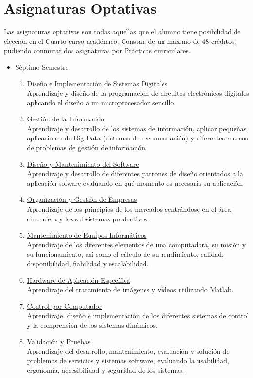 \section{Asignaturas Optativas}
Las asignaturas optativas son todas aquellas que el alumno tiene posibilidad de elección en el Cuarto curso académico. Constan de un máximo de 48 créditos, pudiendo   conmutar dos asignaturas por Prácticas curriculares. 
\begin{itemize}
\item Séptimo Semestre
\begin{enumerate}
\item \underline{Diseño e Implementación de Sistemas Digitales}\\Aprendizaje y diseño de la programación de circuitos electrónicos digitales aplicando el diseño a un microprocesador sencillo. 
\item \underline{Gestión de la Información}\\Aprendizaje y desarrollo de los sistemas de información, aplicar pequeñas aplicaciones de Big Data (sistemas de recomendación) y diferentes marcos de problemas de gestión de información. 
\item \underline{Diseño y Mantenimiento del Software}\\Aprendizaje y desarrollo de diferentes patrones de diseño orientados a la aplicación sofware evaluando en qué momento es necesaria su aplicación. 
\item \underline{Organización y Gestión de Empresas}\\Aprendizaje de los principios de los mercados centrándose en el área cinanciera y  los subsistemas productivos. 
\item \underline{Mantenimiento de Equipos Informáticos}\\Aprendizaje de los diferentes elementos de una computadora, su misión y su funcionamiento,  así como el cálculo de su rendimiento, calidad, disponibilidad, fiabilidad y escalabilidad. 
\item \underline{Hardware de Aplicación Específica }\\Aprendizaje del tratamiento de imágenes y vídeos utilizando Matlab.
\item \underline{Control por Computador}\\Aprendizaje, diseño e implementación de los diferentes sistemas de control y la comprensión de los sistemas dinámicos.
\item \underline{Validación y Pruebas}\\Aprendizaje del desarrollo, mantenimiento, evaluación y solución de problemas de servicios y sistemas software, evaluando la usabilidad, ergonomía, accesibilidad y seguridad de los sistemas. 

\end{enumerate}
\end{itemize}
